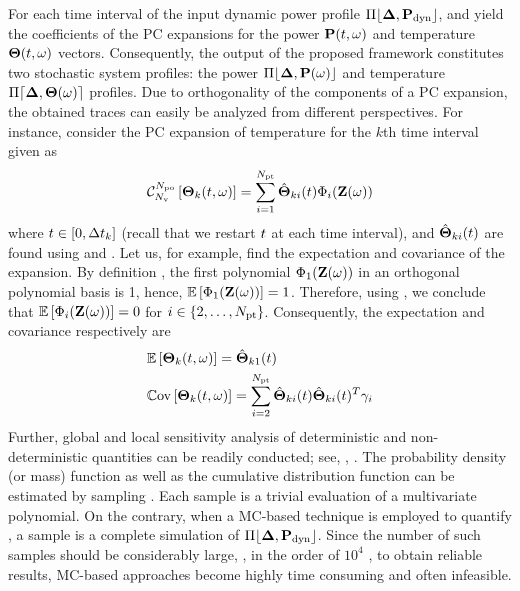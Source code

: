 For each time interval of the input dynamic power profile $\profPdyn$,  and  yield the coefficients of the PC expansions for the power $\mathbf{P}(t, \omega)$ and temperature ${\boldsymbol\Theta}(t, \omega)$ vectors. Consequently, the output of the proposed framework constitutes two stochastic system profiles: the power $\profP{\o}$ and temperature $\profT{\o}$ profiles. Due to orthogonality of the components of a PC expansion, the obtained traces can easily be analyzed from different perspectives. For instance, consider the PC expansion of temperature for the $k$th time interval given as
\begin{equation} \elabel{pc-k}
  \oPC{\vars}{\pcorder}{\vTO_k(\t, \o)} = \sum_{i = 1}^{\pcterms} \pcc{\vTO}_{ki}(\t) \pcb_i(\vZ(\o))
\end{equation}
where $t \in [0, \Delta t_k]$ (recall that we restart $t$ at each time interval), and $\hat{{\boldsymbol\Theta}}_{ki}(t)$ are found using  and . Let us, for example, find the expectation and covariance of the expansion. By definition \cite{xiu2010}, the first polynomial $\Phi_1(\mathbf{Z}(\omega))$ in an orthogonal polynomial basis is 1, hence, $\mathbb{E}\left[\Phi_1(\mathbf{Z}(\omega))\right] = 1$. Therefore, using , we conclude that $\mathbb{E}\left[\Phi_i(\mathbf{Z}(\omega))\right] = 0$ for $i \in \{ 2, \dotsc, {N_\text{pt}} \}$. Consequently, the expectation and covariance respectively are
\begin{align*}
  & \mathbb{E}\left[{\boldsymbol\Theta}_k(t, \omega)\right] = \hat{{\boldsymbol\Theta}}_{k1}(t) \\
  & \mathbb{C}\text{ov}\left[{\boldsymbol\Theta}_k(t, \omega)\right] = \sum_{i = 2}^{{N_\text{pt}}} \hat{{\boldsymbol\Theta}}_{ki}(t) \hat{{\boldsymbol\Theta}}_{ki}(t)^T \gamma_i
\end{align*}
Further, global and local sensitivity analysis of deterministic and non-deterministic quantities can be readily conducted; see, \eg, \cite{eldred2009, maitre2010}. The probability density (or mass) function as well as the cumulative distribution function can be estimated by sampling . Each sample is a trivial evaluation of a multivariate polynomial. On the contrary, when a MC-based technique is employed to quantify , a sample is a complete simulation of $\profPdyn$. Since the number of such samples should be considerably large, \eg, in the order of $10^4$ \cite{xiu2010}, to obtain reliable results, MC-based approaches become highly time consuming and often infeasible.

